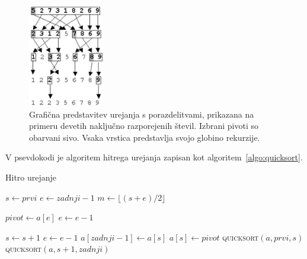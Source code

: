 \documentclass[a4paper,oneside,12pt]{article}
\begin{document}
\begin{figure}[ht]
    \begin{center}
        \includegraphics[height=45mm]{slike/quicksort.jpg}
    \end{center}
    \vspace{-0.7cm}
    \caption[Hitro urejanje]{Grafična predstavitev urejanja s porazdelitvami,
prikazana na primeru devetih naključno razporejenih 
števil. Izbrani pivoti so obarvani sivo.
Vsaka vrstica predstavlja svojo globino rekurzije.}
    \label{fig:quicksortimage}
\end{figure}

V psevdokodi je algoritem hitrega urejanja zapisan kot algoritem~\ref{algo:quicksort}.

\begin{algorithm}[h!t!]
  \caption{Hitro urejanje}\label{algo:quicksort}
  \begin{algorithmic}[1]
         \Return \EndIf
        \State $s \gets prvi$
        \State $e \gets zadnji - 1$
        \State $m \gets \lfloor(s+e)/2\rfloor$
        \EndIf

        \State $pivot \gets a[e]$
        \State $e \gets e - 1$

                \State $s \gets s + 1$
            \EndWhile
                \State $e \gets e - 1$
            \EndWhile
            \EndIf
        \EndWhile
        \State $a[zadnji - 1] \gets a[s]$
        \State $a[s] \gets pivot$
        \State \textsc{quicksort}$(a, prvi, s)$
        \State \textsc{quicksort}$(a, s + 1, zadnji)$
    \EndFunction
  \end{algorithmic}
\end{algorithm}
\end{document}
